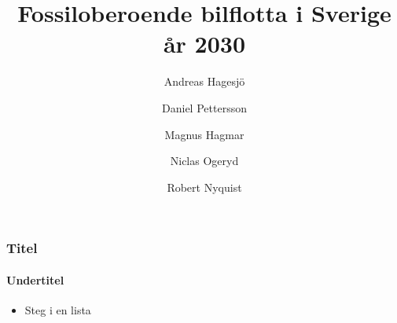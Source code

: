 \documentclass{beamer}
\title{Fossiloberoende bilflotta i Sverige år 2030}
\author{Andreas Hagesjö \and Daniel Pettersson \and
Magnus Hagmar \and Niclas Ogeryd \and Robert Nyquist}
\begin{document}
\frame{\titlepage}

\begin{frame}
	\frametitle{Titel}
	\framesubtitle{Undertitel}
	\begin{itemize}[<+->]
		\item Steg i en lista
	\end{itemize}
\end{frame}
\end{document}
